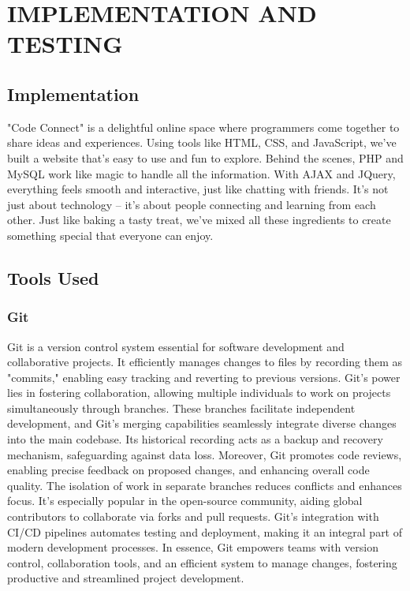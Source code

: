 \chapter{IMPLEMENTATION AND TESTING}
\section{Implementation}
"Code Connect" is a delightful online space where programmers come together to share ideas and experiences. Using tools like HTML, CSS, and JavaScript, we've built a website that's easy to use and fun to explore. Behind the scenes, PHP and MySQL work like magic to handle all the information. With AJAX and JQuery, everything feels smooth and interactive, just like chatting with friends. It's not just about technology – it's about people connecting and learning from each other. Just like baking a tasty treat, we've mixed all these ingredients to create something special that everyone can enjoy.





\section{Tools Used}
\subsection{Git}
Git is a version control system essential for software development and collaborative projects. It efficiently manages changes to files by recording them as "commits," enabling easy tracking and reverting to previous versions. Git's power lies in fostering collaboration, allowing multiple individuals to work on projects simultaneously through branches. These branches facilitate independent development, and Git's merging capabilities seamlessly integrate diverse changes into the main codebase. Its historical recording acts as a backup and recovery mechanism, safeguarding against data loss. Moreover, Git promotes code reviews, enabling precise feedback on proposed changes, and enhancing overall code quality. The isolation of work in separate branches reduces conflicts and enhances focus. It's especially popular in the open-source community, aiding global contributors to collaborate via forks and pull requests. Git's integration with CI/CD pipelines automates testing and deployment, making it an integral part of modern development processes. In essence, Git empowers teams with version control, collaboration tools, and an efficient system to manage changes, fostering productive and streamlined project development.
